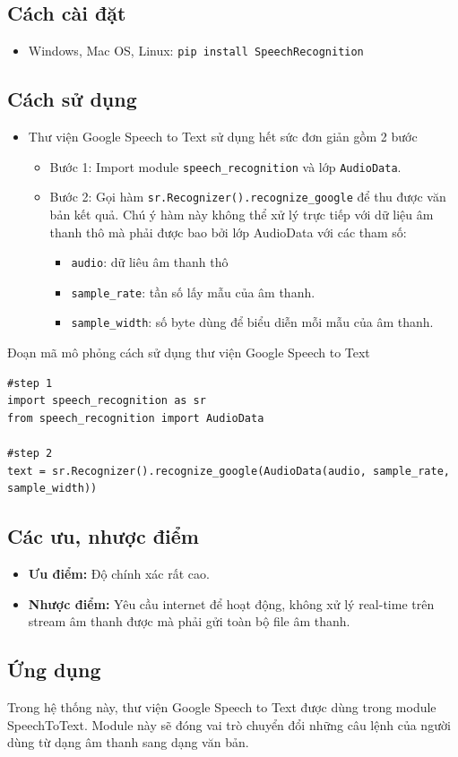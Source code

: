 \subsection{Cách cài đặt}
\begin{itemize}
\item Windows, Mac OS, Linux: \lstinline[language=bash]{pip install SpeechRecognition}
\end{itemize}

\subsection{Cách sử dụng}
\begin{itemize}
\item Thư viện Google Speech to Text sử dụng hết sức đơn giản gồm 2 bước
\begin{itemize}
\item Bước 1: Import module \lstinline{speech_recognition} và lớp \lstinline{AudioData}.
\item Bước 2: Gọi hàm \lstinline{sr.Recognizer().recognize_google} để thu được văn bản kết quả. Chú ý hàm này không thể xử lý trực tiếp với dữ liệu âm thanh thô mà phải được bao bởi lớp AudioData với các tham số:
\begin{itemize}
\item \lstinline{audio}: dữ liêu âm thanh thô
\item \lstinline{sample_rate}: tần số lấy mẫu của âm thanh.
\item \lstinline{sample_width}: số byte dùng để biểu diễn mỗi mẫu của âm thanh.
\end{itemize}
\end{itemize}
\end{itemize}

Đoạn mã mô phỏng cách sử dụng thư viện Google Speech to Text
\begin{lstlisting}
#step 1
import speech_recognition as sr
from speech_recognition import AudioData

#step 2
text = sr.Recognizer().recognize_google(AudioData(audio, sample_rate, sample_width))
\end{lstlisting}

\subsection{Các ưu, nhược điểm}

\begin{itemize}
    \item \textbf{Ưu điểm:} Độ chính xác rất cao.
    \item \textbf{Nhược điểm:} Yêu cầu internet để hoạt động, không xử lý real-time trên stream âm thanh được mà phải gửi toàn bộ file âm thanh.
\end{itemize}

\subsection{Ứng dụng}

Trong hệ thống này, thư viện Google Speech to Text được dùng trong module SpeechToText. Module này sẽ đóng vai trò chuyển đổi những câu lệnh của người dùng từ dạng âm thanh sang dạng văn bản.
